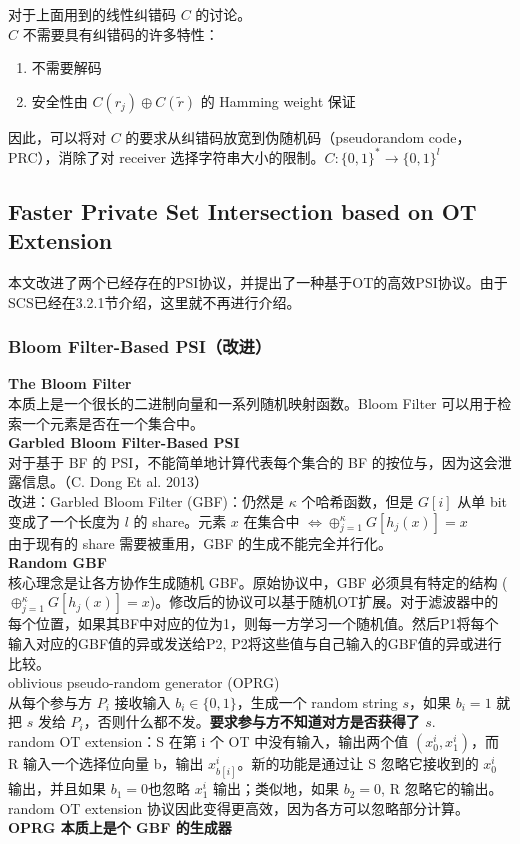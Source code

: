 \begin{remark}
对于上面用到的线性纠错码 $C$ 的讨论。\\
$C$ 不需要具有纠错码的许多特性：
\begin{enumerate}
    \item 不需要解码
    \item 安全性由 $C(r_j)\oplus C(\widetilde{r})$ 的 Hamming weight 保证
\end{enumerate}
\noindent 因此，可以将对 $C$ 的要求从纠错码放宽到伪随机码（pseudorandom code，PRC），消除了对 receiver 选择字符串大小的限制。$C:\{0,1\}^*\to\{0,1\}^l$ \\
\end{remark}
\subsection{ Faster Private Set Intersection based on OT Extension\cite{pinkas2014faster} }
\noindent 本文改进了两个已经存在的PSI协议，并提出了一种基于OT的高效PSI协议。由于SCS已经在3.2.1节介绍，这里就不再进行介绍。
\subsubsection{Bloom Filter-Based PSI（改进）}
\noindent \textbf{The Bloom Filter}\\
本质上是一个很长的二进制向量和一系列随机映射函数。Bloom Filter 可以用于检索一个元素是否在一个集合中。\\
\textbf{Garbled Bloom Filter-Based PSI}\\
对于基于 BF 的 PSI，不能简单地计算代表每个集合的 BF 的按位与，因为这会泄露信息。（C. Dong Et al. 2013）\\
改进：Garbled Bloom Filter (GBF)：仍然是 $\kappa$ 个哈希函数，但是 $G[i]$ 从单 bit 变成了一个长度为 $l$ 的 share。元素 $x$ 在集合中 $\iff \oplus_{j=1}^\kappa G[h_j(x)]=x$\\
由于现有的 share 需要被重用，GBF 的生成不能完全并行化。\\
\textbf{Random GBF}\\
核心理念是让各方协作生成随机 GBF。原始协议中，GBF 必须具有特定的结构 ($\oplus_{j=1}^\kappa G[h_j(x)]=x$)。修改后的协议可以基于随机OT扩展。对于滤波器中的每个位置，如果其BF中对应的位为1，则每一方学习一个随机值。然后P1将每个输入对应的GBF值的异或发送给P2, P2将这些值与自己输入的GBF值的异或进行比较。\\
oblivious pseudo-random generator (OPRG)\\
  从每个参与方 $P_i$ 接收输入 $b_i\in \{0,1\}$，生成一个 random string $s$，如果 $b_i=1$ 就把 $s$ 发给 $P_i$，否则什么都不发。\textbf{要求参与方不知道对方是否获得了 $s$}.\\
  random OT extension：S 在第 i 个 OT 中没有输入，输出两个值 $(x^i_0, x^i_1)$，而 R 输入一个选择位向量 b，输出 $x^i_{b[i]}$。新的功能是通过让 S 忽略它接收到的 $x^i_0$ 输出，并且如果 $b_1 = 0$也忽略 $x^i_1$ 输出；类似地，如果 $b_2 = 0$, R 忽略它的输出。random OT extension 协议因此变得更高效，因为各方可以忽略部分计算。\\
\textbf{OPRG 本质上是个 GBF 的生成器}
